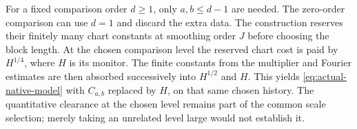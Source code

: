 For a fixed comparison order $d\ge1$, only $a,b\le d-1$ are needed.
The zero-order comparison can use $d=1$ and discard the extra data.
The construction reserves their finitely many chart constants at
smoothing order $J$ before choosing the block length. At the chosen
comparison level the reserved chart cost is paid by $H^{1/4}$,
where $H$ is its monitor. The finite constants from the multiplier
and Fourier estimates are then absorbed successively into
$H^{1/2}$ and $H$. This yields \eqref{eq:actual-native-model}
with $C_{a,b}$ replaced by $H$, on that same chosen history.
The quantitative clearance at the chosen level remains part of
the common scale selection; merely taking an unrelated level large
would not establish it.

